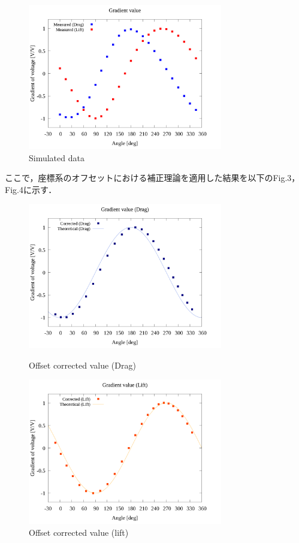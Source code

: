 \documentclass[twocolumn,a4j]{jsarticle}
\begin{document}
\begin{figure}[htbp]
    \footnotesize
    \begin{center}
        \includegraphics[width=85mm]{../../../02_workspace/result/simulation_tx=10.0_ty=-5.0_dx=5.00_dy=-2.50/plot/05/05_summary-wave.png}
        \caption{Simulated data }
    \end{center}
\end{figure}

ここで，座標系のオフセットにおける補正理論を適用した結果を以下のFig.3，Fig.4に示す．

\begin{figure}[htbp]
    \begin{center}
        \includegraphics[width=85mm]{../../../02_workspace/result/simulation_tx=10.0_ty=-5.0_dx=5.00_dy=-2.50/plot/21/21-2_corrected_offset_drag.png}
        \caption{Offset corrected value (Drag) }
        \includegraphics[width=85mm]{../../../02_workspace/result/simulation_tx=10.0_ty=-5.0_dx=5.00_dy=-2.50/plot/21/21-2_corrected_offset_lift.png}
        \caption{Offset corrected value (lift) }
    \end{center}
\end{figure}
\end{document}
